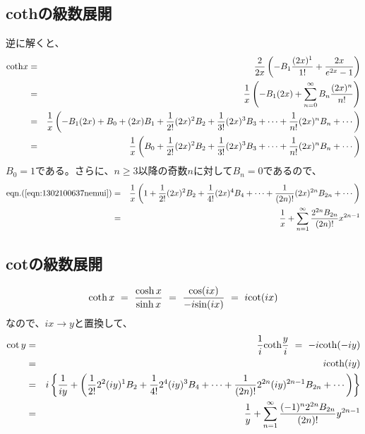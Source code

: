 \documentclass[uplatex,a4j,12pt,dvipdfmx]{jsarticle}
\begin{document}
\subsection{cothの級数展開}

逆に解くと、
\begin{eqnarray}
	{\rm coth}x
	&=&
	\dfrac{2}{2x}
	\left(
	-
	B_{1}
	\dfrac{(2x)^{1}}{1!}
	+
	\dfrac{2x}{e^{2x}-1}
	\right)
	\nonumber \\ &=&
	\dfrac{1}{x}
	\left(
	-B_{1}(2x)
	+
	\sum_{n=0}^{\infty}
	B_{n}
	\dfrac{(2x)^{n}}{n!}
	\right)
	\nonumber \\ &=&
	\dfrac{1}{x}
	\left(
	-B_{1}(2x)
	+
	B_{0}
	+
	(2x)
	B_{1}
	+
	\dfrac{1}{2!}
	(2x)^{2}
	B_{2}
	+
	\dfrac{1}{3!}
	(2x)^{3}
	B_{3}
	+
	\cdots
	+
	\dfrac{1}{n!}
	(2x)^{n}
	B_{n}
	+
	\cdots
	\right)
	\nonumber \\ &=&
	\dfrac{1}{x}
	\left(
	B_{0}
	+
	\dfrac{1}{2!}
	(2x)^{2}
	B_{2}
	+
	\dfrac{1}{3!}
	(2x)^{3}
	B_{3}
	+
	\cdots
	+
	\dfrac{1}{n!}
	(2x)^{n}
	B_{n}
	+
	\cdots
	\right)
	\label{eqn:1302100637nemui}
\end{eqnarray}
$B_{0}=1$である。さらに、$n \geq 3$以降の奇数$n$に対して$B_{n}=0$であるので、
\begin{eqnarray}
	{\rm eqn.}(\ref{eqn:1302100637nemui})
	&=&
	\dfrac{1}{x}
	\left(
	1
	+
	\dfrac{1}{2!}
	(2x)^{2}
	B_{2}
	+
	\dfrac{1}{4!}
	(2x)^{4}
	B_{4}
	+
	\cdots
	+
	\dfrac{1}{(2n)!}
	(2x)^{2n}
	B_{2n}
	+
	\cdots
	\right)
	\nonumber \\ &=&
	\dfrac{1}{x}
	+
	\sum_{n=1}^{\infty}
	\dfrac{
		2^{2n}
		B_{2n}
	}{(2n)!}
	x^{2n-1}
\end{eqnarray}




\subsection{cotの級数展開}
\begin{eqnarray}
	{\rm coth} \ \! x
	\ = \
	\dfrac{{\rm cosh} \ \! x}{{\rm sinh} \ \! x}
	\ = \
	\dfrac{{\rm cos}(ix)}{-i{\rm sin}(ix)}
	\ = \
	i {\rm cot} (ix)
\end{eqnarray}
なので、$ix \to y$と置換して、
\begin{eqnarray}
	{\rm cot} \ \! y
	&=&
	\dfrac{1}{i} {\rm coth} \dfrac{y}{i}
	\ = \
	-i {\rm coth} (-iy)
	\nonumber \\ &=&
	i {\rm coth} (iy)
	\nonumber \\ &=&
	i
	\left\{
	\dfrac{1}{iy}
	+
	\left(
	\dfrac{1}{2!}
	2^{2} (iy)^{1}
	B_{2}
	+
	\dfrac{1}{4!}
	2^{4} (iy)^{3}
	B_{4}
	+
	\cdots
	+
	\dfrac{1}{(2n)!}
	2^{2n} (iy)^{2n-1}
	B_{2n}
	+
	\cdots
	\right)
	\right\}
	\nonumber \\ &=&
	\dfrac{1}{y}
	+
	\sum_{n=1}^{\infty}
	\dfrac{(-1)^{n} 2^{2n} B_{2n} }{(2n)!}
	y^{2n-1}
\end{eqnarray}
\end{document}
